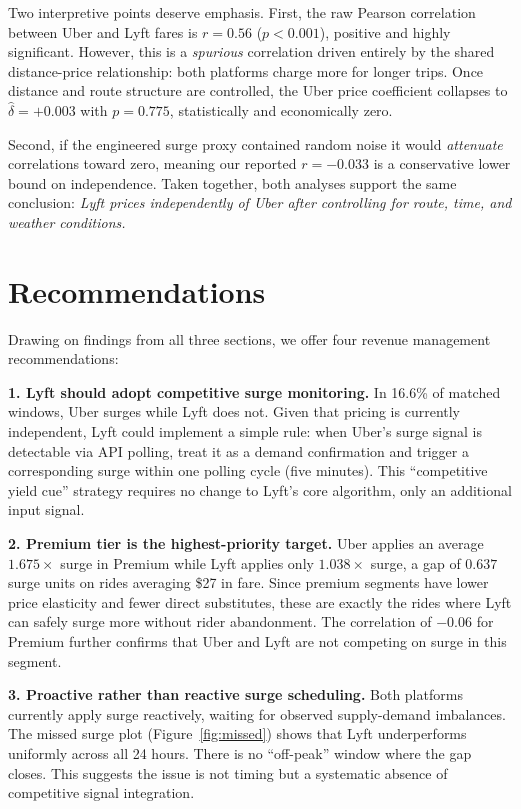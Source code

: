 \documentclass[11pt, letterpaper]{article}
\begin{document}
Two interpretive points deserve emphasis. First, the raw Pearson
correlation between Uber and Lyft fares is $r = 0.56$ ($p < 0.001$),
positive and highly significant. However, this is a \textit{spurious}
correlation driven entirely by the shared distance-price relationship:
both platforms charge more for longer trips. Once distance and route
structure are controlled, the Uber price coefficient collapses to
$\hat{\delta} = +0.003$ with $p = 0.775$, statistically and
economically zero.

Second, if the engineered surge proxy contained random noise it would
\textit{attenuate} correlations toward zero, meaning our reported
$r = -0.033$ is a conservative lower bound on independence. Taken
together, both analyses support the same conclusion: \textit{Lyft
prices independently of Uber after controlling for route, time, and
weather conditions.}

\section{Recommendations}
\label{sec:recommendations}

Drawing on findings from all three sections, we offer four revenue
management recommendations:

\textbf{1. Lyft should adopt competitive surge monitoring.}
In 16.6\% of matched windows, Uber surges while Lyft does not. Given
that pricing is currently independent, Lyft could implement a simple
rule: when Uber's surge signal is detectable via API polling, treat it
as a demand confirmation and trigger a corresponding surge within one
polling cycle (five minutes). This ``competitive yield cue'' strategy
requires no change to Lyft's core algorithm, only an additional input
signal.

\textbf{2. Premium tier is the highest-priority target.}
Uber applies an average $1.675\times$ surge in Premium while Lyft
applies only $1.038\times$ surge, a gap of $0.637$ surge units on rides
averaging \$27 in fare. Since premium segments have lower price
elasticity and fewer direct substitutes, these are exactly the rides
where Lyft can safely surge more without rider abandonment. The
correlation of $-0.06$ for Premium further confirms that Uber and Lyft
are not competing on surge in this segment.

\textbf{3. Proactive rather than reactive surge scheduling.}
Both platforms currently apply surge reactively, waiting for observed
supply-demand imbalances. The missed surge plot (Figure~\ref{fig:missed})
shows that Lyft underperforms uniformly across all 24 hours. There is no ``off-peak'' window where the gap closes. This suggests the
issue is not timing but a systematic absence of competitive signal
integration.
\end{document}
